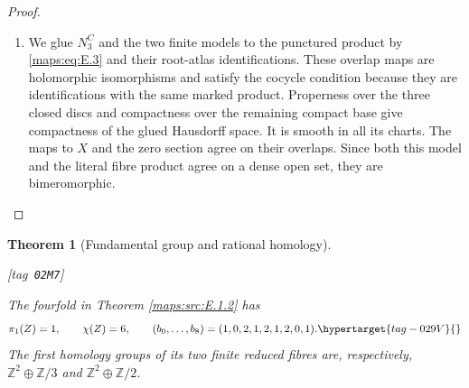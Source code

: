 \documentclass[11pt,a4paper]{article}
\numberwithin{equation}{section}
\newtheorem{theorem}{Theorem}[section]
\theoremstyle{definition}
\newcommand{\StatementRecord}[4]{{\upshape\footnotesize[tag~\texttt{#3}]}\enspace\ignorespaces}
\begin{document}
\begin{proof}
\begin{enumerate}[label=\arabic*.,leftmargin=*]
\item We glue $N_3^C$ and the two finite models to the punctured product by
\eqref{maps:eq:E.3} and their root-atlas identifications.  These overlap maps are
holomorphic isomorphisms and satisfy the cocycle condition because
they are identifications with the same marked product.  Properness
over the three closed discs and compactness over the remaining compact
base give compactness of the glued Hausdorff space.  It is smooth in all its charts.  The maps to $X$ and the zero section
agree on their overlaps.  Since both this model and the literal
fibre product agree on a dense open set, they are bimeromorphic.
\end{enumerate}
\end{proof}



\begin{theorem}[Fundamental group and rational homology]\hypertarget{tag-02M7}{}\label{maps:src:E.1.4}
\StatementRecord{maps:src:E.1.4}{proved}{02M7}{\cref{maps:src:E.1.2}, \cref{maps:src:E.1.3}, \eqref{maps:eq:E.10}, \eqref{maps:eq:E.11}}


The fourfold in Theorem \ref{maps:src:E.1.2} has
\begin{equation}
 \pi_1(Z)=1,\qquad \chi(Z)=6,\qquad
 (b_0,\ldots,b_8)=(1,0,2,1,2,1,2,0,1).
 \hypertarget{tag-029V}{}\label{maps:eq:E.8}
\end{equation}
The first homology groups of its two finite reduced fibres are,
respectively, $\mathbb Z^2\oplus\mathbb Z/3$ and
$\mathbb Z^2\oplus\mathbb Z/2$.

\end{theorem}
\end{document}
